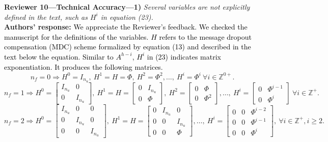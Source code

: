 \textbf{Reviewer 10---Technical Accuracy---1)}\textit{ %
Several variables are not explicitly defined in the text, such as $H^i$ in equation (23).}\\[2mm]
\textbf{Authors' response:} \textcolor{black}{We appreciate the Reviewer's feedback. We checked the manuscript for the definitions of the variables. $H$ refers to the message dropout compensation (MDC) scheme formalized by equation (13) and described in the text below the equation. Similar to $A^{h-i}$, $H^{i}$ in (23) indicates matrix exponentiation. It produces the following matrices.}
\begin{equation*}
    n_f = 0 \Rightarrow H^0 = I_{n_u},~H^1 = H = \mathit{\Phi},~H^2 = \mathit{\Phi}^{2},\dots,~H^i= \mathit{\Phi}^i~\forall i\in\mathbb{Z}^{0+}.
\end{equation*}
\begin{equation*}
    n_f = 1 \Rightarrow H^0 = \begin{bmatrix} I_{n_u} & 0 \\ 0 & I_{n_u} \end{bmatrix},~H^1 = H = \begin{bmatrix} 0 & I_{n_u} \\ 0 & \mathit{\Phi} \end{bmatrix},~H^2 = \begin{bmatrix} 0 & \mathit{\Phi} \\ 0 & \mathit{\Phi}^2 \end{bmatrix},\dots,
    ~H^i = \begin{bmatrix} 0 & \mathit{\Phi}^{i-1} \\ 0 & \mathit{\Phi}^i \end{bmatrix}~\forall i\in\mathbb{Z}^{+}.
\end{equation*}
\begin{equation*}
    n_f = 2 \Rightarrow H^0 =\! \begin{bmatrix} I_{n_u} & 0 & 0 \\ 0 & I_{n_u} & 0 \\ 0 & 0 & I_{n_u} \end{bmatrix}\!,~H^1 = H =\! \begin{bmatrix} 0 & I_{n_u} & 0 \\ 0 & 0 & I_{n_u} \\ 0 & 0 & \mathit{\Phi} \end{bmatrix}\!,\dots,
    ~H^i =\! \begin{bmatrix} 0 & 0 & \mathit{\Phi}^{i-2} \\ 0 & 0 & \mathit{\Phi}^{i-1} \\ 0 & 0 & \mathit{\Phi}^i \end{bmatrix}\!,
    ~\forall i\in\mathbb{Z}^{+}, i\geq 2. 
\end{equation*}
